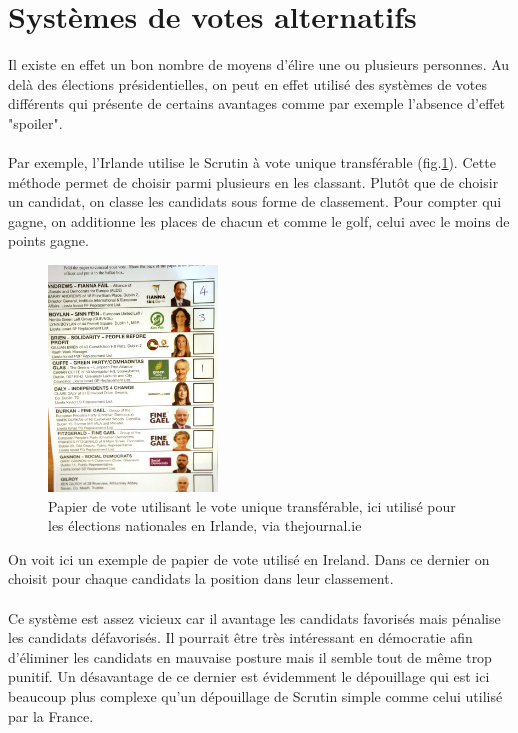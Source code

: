 \documentclass[11pt,a4paper]{report}
\begin{document}
\section{Systèmes de votes alternatifs}
Il existe en effet un bon nombre de moyens d’élire une ou plusieurs personnes. Au delà des élections présidentielles, on peut en effet utilisé des systèmes de votes différents qui présente de certains avantages comme par exemple l'absence d'effet "spoiler".

\paragraph{}
Par exemple, l'Irlande utilise le Scrutin à vote unique transférable (fig.\ref{sim:transfer-ex}).
Cette méthode permet de choisir parmi plusieurs en les classant. Plutôt que de choisir un candidat, on classe les candidats sous forme de classement.
Pour compter qui gagne, on additionne les places de chacun et comme le golf, celui avec le moins de points gagne.

\newpage
\begin{figure}[h]
	\centering
	\includegraphics[width=0.4\textwidth]{./images/transfer.png}
	\caption{Papier de vote utilisant le vote unique transférable, ici utilisé pour les élections nationales en Irlande, via thejournal.ie \cite{thejournal:ireland}}
	\label{sim:transfer-ex}
\end{figure}

On voit ici un exemple de papier de vote utilisé en
Ireland. Dans ce dernier on choisit pour chaque candidats la position dans leur classement.

\paragraph{}
Ce système est assez vicieux car il avantage les candidats favorisés mais pénalise les candidats défavorisés.
Il pourrait être très intéressant en démocratie afin d'éliminer les candidats en mauvaise posture mais il semble tout de même trop punitif.
Un désavantage de ce dernier est évidemment le dépouillage qui est ici beaucoup plus complexe qu’un dépouillage de Scrutin simple comme celui utilisé par la France.
\end{document}
